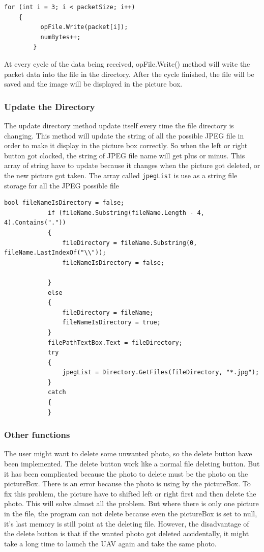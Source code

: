 \documentclass[oneside]{ecsgdp}         %
\begin{document}
\begin{lstlisting}[caption={writing binary file},label=lst:writingb]          
	for (int i = 3; i < packetSize; i++)
	{
          opFile.Write(packet[i]);
          numBytes++;
    	}
\end{lstlisting}         

       At every cycle of the data being received, opFile.Write() method will write the packet data into the file in the directory. After the cycle finished, the file will be saved and the image will be displayed in the picture box. 
\subsubsection*{Update the Directory}
The update directory method update itself every time the file directory is changing. This method will update the string of all the possible JPEG file in order to make it display in the picture box correctly. So when the left or right button got clocked, the string of JPEG file name will get plus or minus. This array of string have to update because it changes when the picture got deleted, or the new picture got taken. The array called \texttt{jpegList} is use as a string file storage for all the JPEG possible file
\begin{lstlisting}[caption=update directory class highlight, label=updateD]
            bool fileNameIsDirectory = false;
            if (fileName.Substring(fileName.Length - 4, 4).Contains("."))
            {
                fileDirectory = fileName.Substring(0, fileName.LastIndexOf("\\"));
                fileNameIsDirectory = false;

            }
            else
            {
                fileDirectory = fileName;
                fileNameIsDirectory = true;
            }
            filePathTextBox.Text = fileDirectory;
            try
            {
                jpegList = Directory.GetFiles(fileDirectory, "*.jpg");
            }
            catch
            {
            }
\end{lstlisting}
\subsubsection*{Other functions}
The user might want to delete some unwanted photo, so the delete button have been implemented. The delete button work like a normal file deleting button. But it has been complicated because the photo to delete must be the photo on the pictureBox. There is an error because the photo is using by the pictureBox. To fix this problem, the picture have to shifted left or right first and then delete the photo. This will solve almost all the problem. But where there is only one picture in the file, the program can not delete because even the pictureBox is set to null, it's last memory is still point at the deleting file. However, the disadvantage of the delete button is that if the wanted photo got deleted accidentally, it might take a long time to launch the UAV again and take the same photo.
\end{document}

